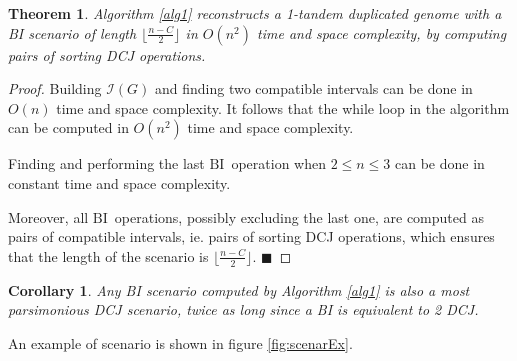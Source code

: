 \documentclass[11pt,final,twoside,nofrench]{thlifl}
\newcommand{\qed}{\ensuremath{\blacksquare}}
\def\BI{\ensuremath{\mbox{BI}}}
\newtheorem{proof}{Proof}
\newtheorem{theorem}{Theorem}
\newtheorem{corollary}{Corollary}
\begin{document}
\begin{theorem}

Algorithm \ref{alg1} reconstructs a 1-tandem duplicated genome with a BI scenario of length $\lfloor \frac{n - C}{2} \rfloor$ in $O(n^2)$ time and space complexity, by computing pairs of sorting DCJ operations.
\end{theorem}

\begin{proof}

Building $\mathcal{I}(G)$ and finding two compatible intervals can be done in $O(n)$ time and space complexity. It follows that the while loop in the algorithm can be computed in $O(n^2)$ time and space complexity.

Finding and performing the last \BI~operation when  $2\leq n\leq 3$ can be done in constant time and space complexity.

Moreover, all \BI~operations, possibly excluding the last one, are computed as 
pairs of compatible intervals, ie. pairs of sorting DCJ operations, which ensures that the length of the scenario 
is $\lfloor \frac{n - C}{2} \rfloor$. \qed
\end{proof}

\begin{corollary}
Any BI scenario computed by Algorithm \ref{alg1} is also a most parsimonious DCJ scenario, twice as long since a BI is equivalent to 2 DCJ.
\end{corollary}

An example of scenario is shown in figure \ref{fig:scenarEx}.
\end{document}
